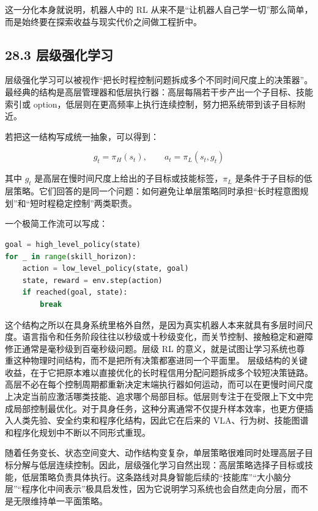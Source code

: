 这一分化本身就说明，机器人中的 RL 从来不是“让机器人自己学一切”那么简单，而是始终要在探索收益与现实代价之间做工程折中。

\subsection*{28.3 层级强化学习}


层级强化学习可以被视作“把长时程控制问题拆成多个不同时间尺度上的决策器”。最经典的结构是高层管理器和低层执行器：高层每隔若干步产出一个子目标、技能索引或 option，低层则在更高频率上执行连续控制，努力把系统带到该子目标附近。

若把这一结构写成统一抽象，可以得到：

\begin{equation*}
g_t = \pi_H(s_t), \qquad a_t = \pi_L(s_t, g_t)
\end{equation*}

其中 \(g_t\) 是高层在慢时间尺度上给出的子目标或技能标签，\(\pi_L\) 是条件于子目标的低层策略。它们回答的是同一个问题：如何避免让单层策略同时承担“长时程意图规划”和“短时程稳定控制”两类职责。

一个极简工作流可以写成：

\begin{lstlisting}[language=python]
goal = high_level_policy(state)
for _ in range(skill_horizon):
    action = low_level_policy(state, goal)
    state, reward = env.step(action)
    if reached(goal, state):
        break
\end{lstlisting}

这个结构之所以在具身系统里格外自然，是因为真实机器人本来就具有多层时间尺度。语言指令和任务阶段往往以秒级或十秒级变化，而关节控制、接触稳定和避障修正通常是毫秒级到百毫秒级问题。层级 RL 的意义，就是试图让学习系统也尊重这种物理时间结构，而不是把所有决策都塞进同一个平面里。 层级结构的关键收益，在于它把原本难以直接优化的长时程信用分配问题拆成多个较短决策链路。高层不必在每个控制周期都重新决定末端执行器如何运动，而可以在更慢时间尺度上决定当前应激活哪类技能、追求哪个局部目标。低层则专注于在受限上下文中完成局部控制最优化。对于具身任务，这种分离通常不仅提升样本效率，也更方便插入人类先验、安全约束和程序化结构，因此它在后来的 VLA、行为树、技能图谱和程序化规划中不断以不同形式重现。

随着任务变长、状态空间变大、动作结构变复杂，单层策略很难同时处理高层子目标分解与低层连续控制。因此，层级强化学习自然出现：高层策略选择子目标或技能，低层策略负责具体执行。这条路线对具身智能后续的“技能库”“大小脑分层”“程序化中间表示”极具启发性，因为它说明学习系统也会自然走向分层，而不是无限维持单一平面策略。

